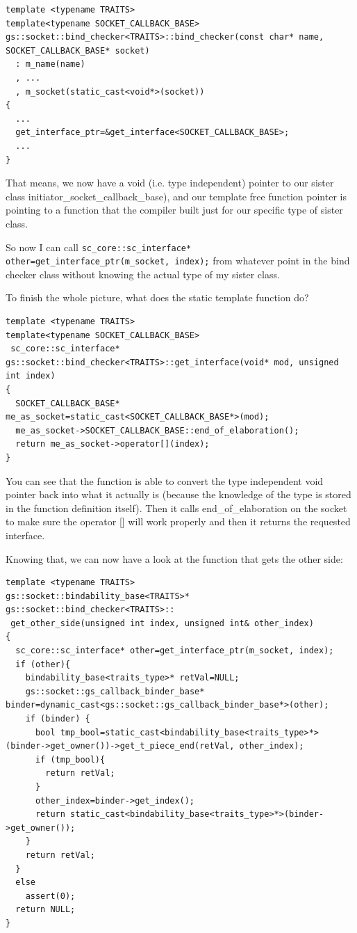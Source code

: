 \documentclass[a4paper,10pt]{article}          %
\newcommand{\code}[1]{{\ttfamily#1}}
\begin{document}
\begin{lstlisting}
template <typename TRAITS>
template<typename SOCKET_CALLBACK_BASE>
gs::socket::bind_checker<TRAITS>::bind_checker(const char* name, SOCKET_CALLBACK_BASE* socket)
  : m_name(name)
  , ...
  , m_socket(static_cast<void*>(socket))
{
  ...
  get_interface_ptr=&get_interface<SOCKET_CALLBACK_BASE>;
  ...
}
\end{lstlisting}

That means, we now have a void (i.e. type independent) pointer to our  sister class   \code{initiator\_socket\_callback\_base}), and our template free function pointer is pointing to a function that the compiler built just for our specific type of sister class.

So now I can call
\lstinline{sc_core::sc_interface* other=get_interface_ptr(m_socket, index);} from whatever point in the bind checker class without knowing the actual type of my sister class.

To finish the whole picture, what does the static template function do?

\begin{lstlisting}
template <typename TRAITS>
template<typename SOCKET_CALLBACK_BASE>
 sc_core::sc_interface* gs::socket::bind_checker<TRAITS>::get_interface(void* mod, unsigned int index)
{
  SOCKET_CALLBACK_BASE* me_as_socket=static_cast<SOCKET_CALLBACK_BASE*>(mod);
  me_as_socket->SOCKET_CALLBACK_BASE::end_of_elaboration();
  return me_as_socket->operator[](index);
}
\end{lstlisting}

You can see that the function is able to convert the type independent void pointer back into what it actually is (because the knowledge of the type is stored in the function definition itself).  Then it calls \code{end\_of\_elaboration} on the socket to make sure the \code{operator []} will work properly and then it returns the requested interface.

Knowing that, we can now have a look at the function that gets the other side:

\begin{lstlisting}
template <typename TRAITS>
gs::socket::bindability_base<TRAITS>* gs::socket::bind_checker<TRAITS>::
 get_other_side(unsigned int index, unsigned int& other_index)
{
  sc_core::sc_interface* other=get_interface_ptr(m_socket, index);
  if (other){
    bindability_base<traits_type>* retVal=NULL;
    gs::socket::gs_callback_binder_base* binder=dynamic_cast<gs::socket::gs_callback_binder_base*>(other);
    if (binder) {
      bool tmp_bool=static_cast<bindability_base<traits_type>*>(binder->get_owner())->get_t_piece_end(retVal, other_index);
      if (tmp_bool){ 
        return retVal;
      }
      other_index=binder->get_index();
      return static_cast<bindability_base<traits_type>*>(binder->get_owner());
    }
    return retVal;
  }
  else
    assert(0);
  return NULL;
}
\end{lstlisting}
\end{document}
